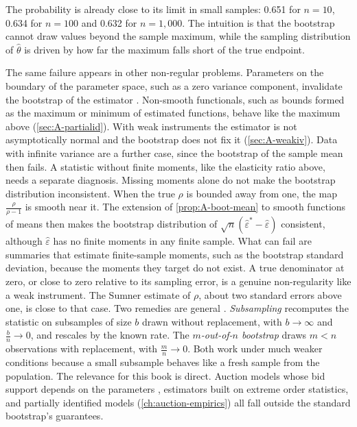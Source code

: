 The probability is already close to its limit in small samples: 0.651 for $n = 10$, 0.634 for $n = 100$ and 0.632
for $n = 1{,}000$. The intuition is that the bootstrap cannot draw values beyond the sample maximum, while the
sampling distribution of $\hat\theta$ is driven by how far the maximum falls short of the true endpoint.

The same failure appears in other non-regular problems. Parameters on the boundary of the parameter space, such as a
zero variance component, invalidate the bootstrap of the estimator \citep{Andrews2000}. Non-smooth functionals,
such as bounds formed as the maximum or minimum of estimated functions, behave like the maximum above
(\cref{sec:A-partialid}). With weak instruments the estimator is not asymptotically normal and the bootstrap does not
fix it (\cref{sec:A-weakiv}). Data with infinite variance are a further case, since the bootstrap of the sample mean
then fails. A statistic without finite moments, like the elasticity ratio above, needs a separate diagnosis. Missing
moments alone do not make the bootstrap distribution inconsistent. When the true $\rho$ is bounded away from one, the
map $\frac{\rho}{\rho - 1}$ is smooth near it. The extension of \cref{prop:A-boot-mean} to smooth functions of means
then makes the bootstrap distribution of $\sqrt n(\hat\varepsilon^* - \hat\varepsilon)$ consistent, although
$\hat\varepsilon$ has no finite moments in any finite sample. What can fail are summaries that estimate
finite-sample moments, such as the bootstrap standard deviation, because the moments they target do not exist. A true denominator at zero, or close to zero relative to its sampling error, is a
genuine non-regularity like a weak instrument. The Sumner estimate of $\rho$, about two standard errors above one, is
close to that case. Two remedies are general \citep{PolitisRomanoWolf1999}. \emph{Subsampling} recomputes the statistic on
subsamples of size $b$ drawn without replacement, with $b \to \infty$ and $\frac{b}{n} \to 0$, and rescales by the
known rate. The \emph{$m$-out-of-$n$ bootstrap} draws $m < n$ observations with replacement, with $\frac{m}{n} \to 0$.
Both work under much weaker conditions because a small subsample behaves like a fresh sample from the population.
The relevance for this book is direct. Auction models whose bid support depends on the parameters
\citep{DonaldPaarsch1996}, estimators built on extreme order statistics, and partially identified models
(\cref{ch:auction-empirics}) all fall outside the standard bootstrap's guarantees.
